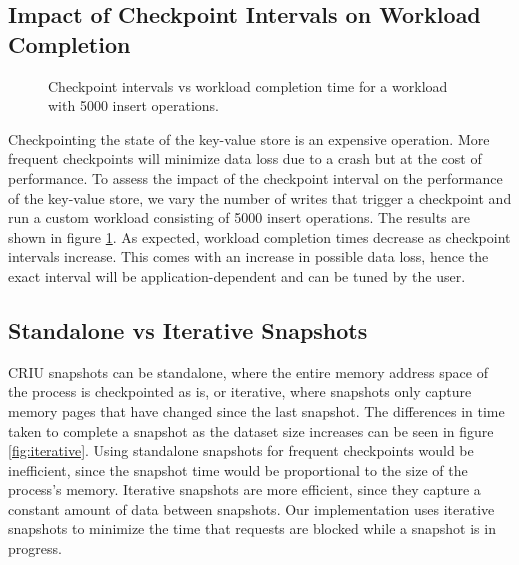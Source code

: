 \documentclass[final]{proc}
\begin{document}
\subsection{Impact of Checkpoint Intervals on Workload Completion}

\begin{figure}
  \caption{Checkpoint intervals vs workload completion time for a workload with 5000 insert operations.}
  \label{fig:freq}
\end{figure}

Checkpointing the state of the key-value store is an expensive operation. More
frequent checkpoints will minimize data loss due to a crash but at the cost of
performance. To assess the impact of the checkpoint interval on the performance
of the key-value store, we vary the number of writes that trigger a checkpoint
and run a custom workload consisting of 5000 insert operations. The results are
shown in figure \ref{fig:freq}. As expected, workload completion times decrease
as checkpoint intervals increase. This comes with an increase in possible data
loss, hence the exact interval will be application-dependent and can be tuned by
the user.

\subsection{Standalone vs Iterative Snapshots}

CRIU snapshots can be standalone, where the entire memory address space of the
process is checkpointed as is, or iterative, where snapshots only capture memory
pages that have changed since the last snapshot. The differences in time taken
to complete a snapshot as the dataset size increases can be seen in figure
\ref{fig:iterative}. Using standalone snapshots for frequent checkpoints would
be inefficient, since the snapshot time would be proportional to the size of the
process's memory. Iterative snapshots are more efficient, since they capture a
constant amount of data between snapshots. Our implementation uses iterative
snapshots to minimize the time that requests are blocked while a snapshot is in
progress.
\end{document}
